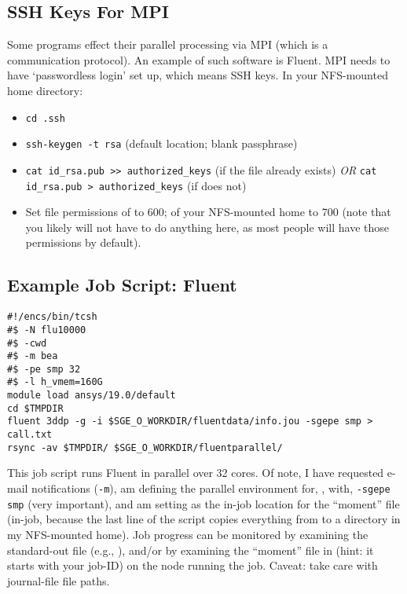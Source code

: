 \documentclass{easychair}
\begin{document}
\subsection{SSH Keys For MPI}

Some programs effect their parallel processing via MPI (which is a communication protocol). An example of such software is Fluent. MPI needs to have `passwordless login' set up, which means SSH keys. In your NFS-mounted home directory:

\begin{itemize}
\item
\texttt{cd .ssh}
\item
\texttt{ssh-keygen -t rsa} (default location; blank passphrase) 
\item
\texttt{cat id\_rsa.pub >> authorized\_keys} (if the  file already exists) \emph{OR} \texttt{cat id\_rsa.pub > authorized\_keys} (if does not) 
\item
Set file permissions of  to 600; of your NFS-mounted home to 700 (note that you likely will not have to do anything here, as most people will have those permissions by default). 
\end{itemize}

\subsection{Example Job Script: Fluent}

\begin{verbatim}
#!/encs/bin/tcsh 
#$ -N flu10000 
#$ -cwd 
#$ -m bea 
#$ -pe smp 32 
#$ -l h_vmem=160G 
module load ansys/19.0/default
cd $TMPDIR 
fluent 3ddp -g -i $SGE_O_WORKDIR/fluentdata/info.jou -sgepe smp > call.txt 
rsync -av $TMPDIR/ $SGE_O_WORKDIR/fluentparallel/ 
\end{verbatim}

This job script runs Fluent in parallel over 32 cores. Of note, I have requested e-mail notifications (\texttt{-m}), am defining the parallel environment for, , with, \texttt{-sgepe  smp} (very important), and am setting  as the in-job location for the ``moment''  file (in-job, because the last line of the script copies everything from  to a directory in my NFS-mounted home). Job progress can be monitored by examining the standard-out file (e.g., ), and/or by examining the ``moment'' file in  (hint: it starts with your job-ID) on the node running the job. Caveat: take care with journal-file file paths.  
\end{document}
